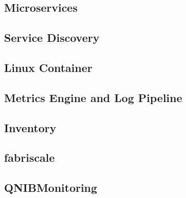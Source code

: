 \subsection{Microservices}



\subsection{Service Discovery}


\subsection{Linux Container}


\subsection{Metrics Engine and Log Pipeline}




\subsection{Inventory}


\subsection{fabriscale}


\subsection{QNIBMonitoring}
